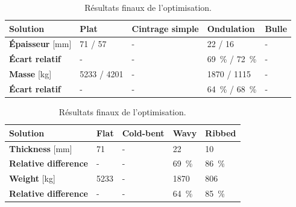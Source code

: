 \documentclass[11pt,titlepage]{article}
\begin{document}
\begin{table}[H]
    \centering
    \caption{Résultats finaux de l'optimisation.}
    \label{tab:result_fin}
    \begin{tabularx}{\textwidth}{l*{4}{Y}}
    \toprule
    \textbf{Solution} & \textbf{Plat}& \textbf{Cintrage simple} & \textbf{Ondulation}& \textbf{Bulle}\\\midrule
    \textbf{Épaisseur} [mm]& 71 / 57  & - & 22 / 16 & -  \\
    \textbf{Écart relatif} & - & - & \qty{69}{\percent} / \qty{72}{\percent} & - \\
    \textbf{Masse} [kg] & 5233 / 4201 & - & 1870 / 1115 & -  \\
    \textbf{Écart relatif} & - & - & \qty{64}{\percent} / \qty{68}{\percent} &  - \\
    \bottomrule
    \end{tabularx}
    \end{table}
\newpage
\begin{table}[H]
    \centering
    \caption{Résultats finaux de l'optimisation.}
    \label{tab:result_fin}
    \begin{tabularx}{\textwidth}{l*{4}{Y}}
    \toprule
    \textbf{Solution} & \textbf{Flat}& \textbf{Cold-bent} & \textbf{Wavy}& \textbf{Ribbed}\\\midrule
    \textbf{Thickness} [mm]& 71  & - & 22 & 10  \\
    \textbf{Relative difference} & - & - & \qty{69}{\percent}  & \qty{86}{\percent} \\
    \textbf{Weight} [kg] & 5233  & - & 1870 & 806 \\
    \textbf{Relative difference} & - & - & \qty{64}{\percent} &  \qty{85}{\percent} \\
    \bottomrule
    \end{tabularx}
    \end{table}
\newpage
\printbibliography
\end{document}
